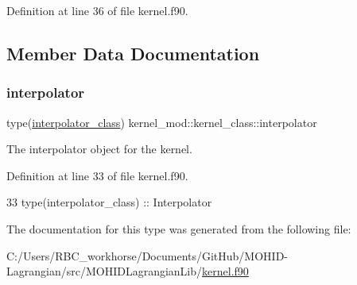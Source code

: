 Definition at line 36 of file kernel.\+f90.



\subsection{Member Data Documentation}
\mbox{\label{structkernel__mod_1_1kernel__class_a9ad0ab75e7c6a0eff5e24d9d5cd3a72d}} 
\subsubsection{\texorpdfstring{interpolator}{interpolator}}
{\footnotesize\ttfamily type(\mbox{\hyperlink{structinterpolator__mod_1_1interpolator__class}{interpolator\+\_\+class}}) kernel\+\_\+mod\+::kernel\+\_\+class\+::interpolator}



The interpolator object for the kernel. 



Definition at line 33 of file kernel.\+f90.


\begin{DoxyCode}
33         \textcolor{keywordtype}{type}(interpolator\_class) :: Interpolator
\end{DoxyCode}


The documentation for this type was generated from the following file\+:\begin{DoxyCompactItemize}
\item 
C\+:/\+Users/\+R\+B\+C\+\_\+workhorse/\+Documents/\+Git\+Hub/\+M\+O\+H\+I\+D-\/\+Lagrangian/src/\+M\+O\+H\+I\+D\+Lagrangian\+Lib/\mbox{\hyperlink{kernel_8f90}{kernel.\+f90}}\end{DoxyCompactItemize}
